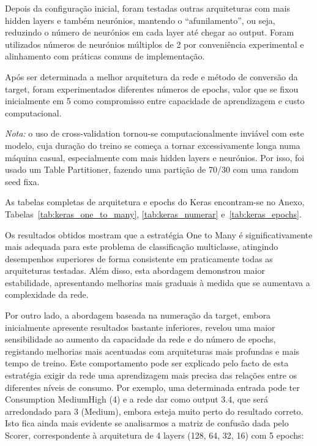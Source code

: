\documentclass[11pt,a4paper]{article}
\begin{document}
Depois da configuração inicial, foram testadas outras arquiteturas com mais hidden layers e também neurónios, mantendo o ``afunilamento'', ou seja, reduzindo o número de neurónios em cada layer até chegar ao output. Foram utilizados números de neurónios múltiplos de 2 por conveniência experimental e alinhamento com práticas comuns de implementação.

Após ser determinada a melhor arquitetura da rede e método de conversão da target, foram experimentados diferentes números de epochs, valor que se fixou inicialmente em 5 como compromisso entre capacidade de aprendizagem e custo computacional.

\textit{Nota:} o uso de cross-validation tornou-se computacionalmente inviável com este modelo, cuja duração do treino se começa a tornar excessivamente longa numa máquina casual, especialmente com mais hidden layers e neurónios. Por isso, foi usado um Table Partitioner, fazendo uma partição de 70/30 com uma random seed fixa.

As tabelas completas de arquitetura e epochs do Keras encontram-se no Anexo, Tabelas~\ref{tab:keras_one_to_many}, \ref{tab:keras_numerar} e~\ref{tab:keras_epochs}.

Os resultados obtidos mostram que a estratégia One to Many é significativamente mais adequada para este problema de classificação multiclasse, atingindo desempenhos superiores de forma consistente em praticamente todas as arquiteturas testadas. Além disso, esta abordagem demonstrou maior estabilidade, apresentando melhorias mais graduais à medida que se aumentava a complexidade da rede.

Por outro lado, a abordagem baseada na numeração da target, embora inicialmente apresente resultados bastante inferiores, revelou uma maior sensibilidade ao aumento da capacidade da rede e do número de epochs, registando melhorias mais acentuadas com arquiteturas mais profundas e mais tempo de treino. Este comportamento pode ser explicado pelo facto de esta estratégia exigir da rede uma aprendizagem mais precisa das relações entre os diferentes níveis de consumo. Por exemplo, uma determinada entrada pode ter Consumption MediumHigh (4) e a rede dar como output 3.4, que será arredondado para 3 (Medium), embora esteja muito perto do resultado correto. Isto fica ainda mais evidente se analisarmos a matriz de confusão dada pelo Scorer, correspondente à arquitetura de 4 layers (128, 64, 32, 16) com 5 epochs:
\end{document}
